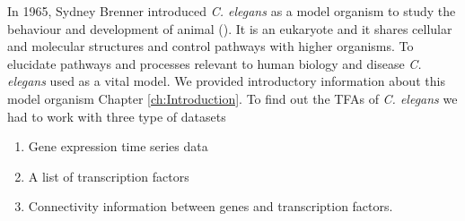 In 1965, Sydney Brenner introduced \textit{C. elegans} as a model organism to study the behaviour and development of animal (\cite{Brenner:1974}). It is an eukaryote and it shares cellular and molecular structures and control pathways with higher organisms. To elucidate pathways and processes relevant to human biology and disease \textit{C. elegans} used as a vital model. We provided introductory information about this model organism Chapter \ref{ch:Introduction}. To find out the TFAs of \textit{C. elegans} we had to work with three type of datasets
\begin{enumerate}
 \item Gene expression time series data 
 \item A list of transcription factors 
 \item Connectivity information between genes and transcription factors.
\end{enumerate}

